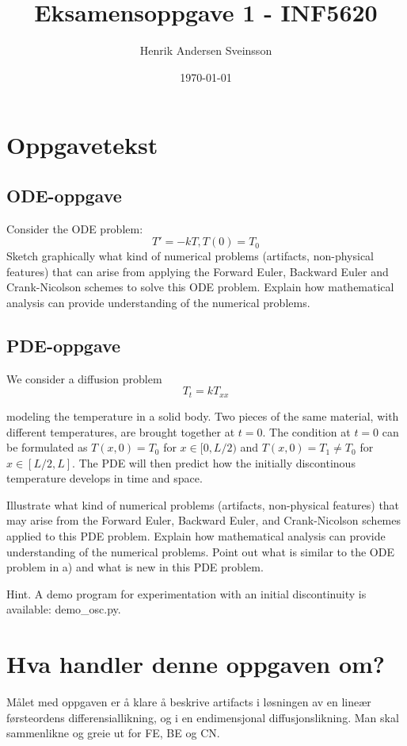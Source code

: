\documentclass[a4paper, 10pt]{article}
\author{Henrik Andersen Sveinsson}
\title{Eksamensoppgave 1 - INF5620}
\date{\today}
\begin{document}
\maketitle

\section{Oppgavetekst}
\subsection{ODE-oppgave}
Consider the ODE problem:
\begin{equation}
	T' = -kT, T(0) = T_0
\end{equation}
Sketch graphically what kind of numerical problems (artifacts, non-physical features) that can arise from applying the Forward Euler, Backward Euler and Crank-Nicolson schemes to solve this ODE problem. Explain how mathematical analysis can provide understanding of the numerical problems.

\subsection{PDE-oppgave}
We consider a diffusion problem
\begin{equation}
	T_t = kT_{xx}
\end{equation}

modeling the temperature in a solid body. Two pieces of the same material, with different temperatures, are brought together at $t=0$. The condition at $t=0$ can be formulated as $T(x, 0) = T_0$ for $x \in [0, L/2)$ and $T(x, 0) = T_1 \neq T_0$ for $x \in [L/2, L]$. The PDE will then predict how the initially discontinous temperature develops in time and space. 

 Illustrate what kind of numerical problems (artifacts, non-physical features) that may arise from the Forward Euler, Backward Euler, and Crank-Nicolson schemes applied to this PDE problem. Explain how mathematical analysis can provide understanding of the numerical problems. Point out what is similar to the ODE problem in a) and what is new in this PDE problem.

Hint. A demo program for experimentation with an initial discontinuity is available: demo\_osc.py. 

\section{Hva handler denne oppgaven om?}
Målet med oppgaven er å klare å beskrive artifacts i løsningen av en lineær førsteordens differensiallikning, og i en endimensjonal diffusjonslikning. Man skal sammenlikne og greie ut for FE, BE og CN.
\end{document}
